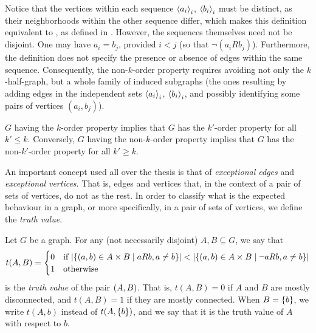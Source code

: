         \begin{remark}
            Notice that the vertices within each sequence $\left< a_i \right>_i$, $\left< b_i \right>_i$ must be distinct,
            as their neighborhoods within the other sequence differ, which makes this definition equivalent to
            , as defined in .
            However, the sequences themselves need not be disjoint.
            One may have $a_i=b_j$, provided $i < j$ (so that $\neg(a_i R b_j)$).
            Furthermore, the definition does not specify the presence or absence of edges within the same sequence.
            Consequently, the non-$k$-order property requires avoiding not only the $k$-half-graph, but a whole family
            of induced subgraphs (the ones resulting by adding edges in the independent sets
            $\left< a_i \right>_i$, $\left< b_i \right>_i$, and possibly identifying some pairs of vertices $(a_i, b_j)$).
        \end{remark}

        \begin{remark}
            $G$ having the $k$-order property implies that $G$ has the $k'$-order property for all $k' \leq k$.
            Conversely, $G$ having the non-$k$-order property implies that $G$ has the non-$k'$-order property for all $k' \geq k$.
        \end{remark}

        An important concept used all over the thesis is that of \emph{exceptional edges} and \emph{exceptional vertices}.
        That is, edges and vertices that, in the context of a pair of sets of vertices, do not  as the rest.
        In order to classify what is the expected behaviour in a graph, or more specifically, in a pair of sets of vertices,
        we define the \emph{truth value}.

        \begin{definition} \label{def:truth_value}
            Let $G$ be a graph.
            For any (not necessarily disjoint) $A, B \subseteq G$, we say that
            \[
                t(A,B) =
                \begin{cases}
                    0 & \text{if } | \{ ( a, b ) \in A \times B \mid a R b, a \neq b \} | <
                        | \{ ( a, b ) \in A \times B \mid \neg a R b, a \neq b \} | \\
                    1 & \text{otherwise}
                \end{cases}
            \]
            is the \emph{truth value} of the pair $( A,B )$.
            That is, $t(A,B) = 0$ if $A$ and $B$ are mostly disconnected, and $t(A,B) = 1$ if they are mostly connected.
            When $B = \{ b \}$, we write $t(A,b)$ instead of $t(A,\{ b \})$, and we say that it is the truth value of $A$
            with respect to $b$.
        \end{definition}

